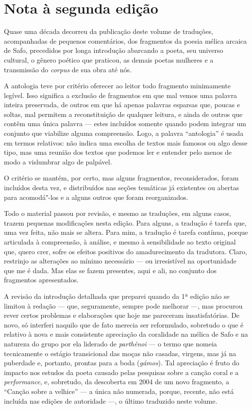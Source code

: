 \chapter{Nota à segunda edição}

Quase uma década decorreu da publicação deste volume de traduções,
acompanhadas de pequenos comentários, dos fragmentos da poesia mélica
arcaica de Safo, precedidos por longa introdução abarcando a poeta, seu
universo cultural, o gênero poético que praticou, as demais poetas
mulheres e a transmissão do \emph{corpus} de sua obra até nós.

A antologia teve por critério oferecer ao leitor todo fragmento
minimamente legível. Isso significa a exclusão de fragmentos em que mal
vemos uma palavra inteira preservada, de outros em que há apenas
palavras esparsas que, poucas e soltas, mal permitem a reconstituição de
qualquer leitura, e ainda de outros que contêm uma única palavra ---
estes incluídos somente quando podem integrar um conjunto que viabilize
alguma compreensão. Logo, a palavra ``antologia'' é usada em termos
relativos: não indica uma escolha de textos mais famosos ou algo desse
tipo, mas uma reunião dos textos que podemos ler e entender pelo menos
de modo a vislumbrar algo de palpável.

O critério se mantém, por certo, mas alguns fragmentos, reconsiderados,
foram incluídos desta vez, e distribuídos nas seções temáticas já
existentes ou abertas para acomodá"-los e a alguns outros que foram
reorganizados.

Todo o material passou por revisão, e mesmo as traduções, em alguns
casos, trazem pequenas modificações nesta edição. Para alguns, a
tradução é tarefa que, uma vez feita, não mais se altera. Para mim, a
tradução é tarefa contínua, porque articulada à compreensão, à análise,
e mesmo à sensibilidade ao texto original que, quero crer, sofre os
efeitos positivos do amadurecimento da tradutora. Claro, restrinjo as
alterações ao mínimo necessário --- ou irresistível na oportunidade que
me é dada. Mas elas se fazem presentes, aqui e ali, no conjunto dos
fragmentos apresentados.

A revisão da introdução detalhada que preparei quando da 1ª edição não
se limitou à redação --- que, seguramente, sempre pode melhorar ---, mas
procurou rever certos problemas e elaborações que hoje me pareceram
insatisfatórias. De novo, só interferi naquilo que de fato merecia ser
reformulado, sobretudo o que é relativo à nova e mais consistente
apreciação da coralidade na mélica de Safo e na natureza do grupo por
ela liderado de \emph{parthénoi} --- o termo que nomeia tecnicamente o
estágio transicional das moças não casadas, virgens, mas já na puberdade
e, portanto, prontas para a boda (\emph{gámos}). Tal apreciação é fruto
do impacto nos estudos da poeta causado pelas pesquisas sobre a canção
coral e a \emph{performance}, e, sobretudo, da descoberta em 2004 de um
novo fragmento, a ``Canção sobre a velhice'' --- a única não numerada,
porque, recente, não está incluída nas edições de autoridade ---, o
último traduzido neste volume.

